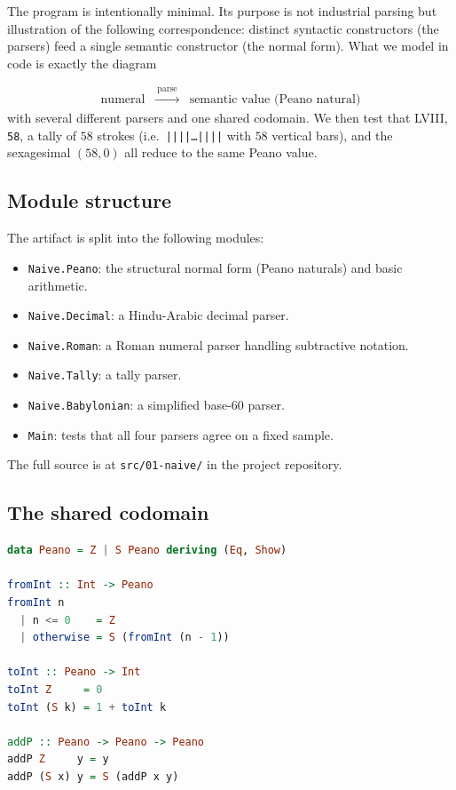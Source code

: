 \documentclass[12pt]{article}
\theoremstyle{definition}
\theoremstyle{remark}
\begin{document}
The program is intentionally minimal. Its purpose is not industrial
parsing but illustration of the following correspondence: distinct
syntactic constructors (the parsers) feed a single semantic constructor
(the normal form). What we model in code is exactly the diagram

\[
\begin{array}{ccc}
\text{numeral} & \xrightarrow{\;\text{parse}\;} & \text{semantic value (Peano natural)}
\end{array}
\]
with several different parsers and one shared codomain. We then test that
\textsf{LVIII}, \texttt{58}, a tally of $58$ strokes (i.e.\
\texttt{||||\dots||||} with $58$ vertical bars), and the sexagesimal
$(58, 0)$ all reduce to the same Peano value.

\subsection{Module structure}

The artifact is split into the following modules:
\begin{itemize}
\item \texttt{Naive.Peano}: the structural normal form (Peano naturals)
and basic arithmetic.
\item \texttt{Naive.Decimal}: a Hindu-Arabic decimal parser.
\item \texttt{Naive.Roman}: a Roman numeral parser handling subtractive
notation.
\item \texttt{Naive.Tally}: a tally parser.
\item \texttt{Naive.Babylonian}: a simplified base-60 parser.
\item \texttt{Main}: tests that all four parsers agree on a fixed sample.
\end{itemize}
The full source is at \texttt{src/01-naive/} in the project repository.

\subsection{The shared codomain}

\begin{lstlisting}[language=Haskell]
data Peano = Z | S Peano deriving (Eq, Show)

fromInt :: Int -> Peano
fromInt n
  | n <= 0    = Z
  | otherwise = S (fromInt (n - 1))

toInt :: Peano -> Int
toInt Z     = 0
toInt (S k) = 1 + toInt k

addP :: Peano -> Peano -> Peano
addP Z     y = y
addP (S x) y = S (addP x y)
\end{lstlisting}
\end{document}
